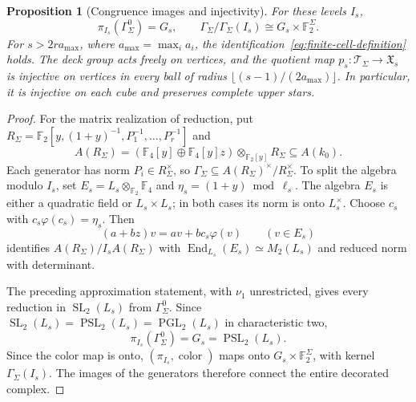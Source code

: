 \documentclass[11pt,letterpaper]{article}
\newtheorem{proposition}[theorem]{Proposition}
\theoremstyle{definition}
\theoremstyle{remark}
\newcommand{\F}{\mathbb F}
\newcommand{\X}{\mathfrak{X}}
\newcommand{\SL}{\operatorname{SL}}
\newcommand{\PGL}{\operatorname{PGL}}
\newcommand{\PSL}{\operatorname{PSL}}
\begin{document}
\begin{proposition}[Congruence images and injectivity]
\label{prop:finite-quotients}
For these levels $I_s$,
\[
 \pi_{I_s}(\Gamma_\Sigma^0)=G_s,\qquad
 \Gamma_\Sigma/\Gamma_\Sigma(I_s)
 \cong G_s\times\F_2^\Sigma.
\]
For $s>2r a_{\max}$, where $a_{\max}=\max_i a_i$,
the identification~\eqref{eq:finite-cell-definition} holds.
The deck group acts freely on vertices, and the quotient map
$p_s:\mathcal T_\Sigma\to\X_s$ is injective on vertices in every
ball of radius $\lfloor(s-1)/(2a_{\max})\rfloor$.
In particular, it is injective on each cube and preserves complete
upper stars.
\end{proposition}
\begin{proof}
For the matrix realization of reduction, put
$R_\Sigma=\F_2[y,(1+y)^{-1},P_1^{-1},\ldots,P_r^{-1}]$ and
\[
 A(R_\Sigma)=(\F_4[y]\oplus\F_4[y]z)\otimes_{\F_2[y]}R_\Sigma
 \subseteq A(k_0).
\]
Each generator has norm $P_i\in R_\Sigma^\times$, so
$\Gamma_\Sigma\subseteq A(R_\Sigma)^\times/R_\Sigma^\times$.
To split the algebra modulo $I_s$, set
$E_s=L_s\otimes_{\F_2}\F_4$ and $\eta_s=(1+y)\bmod\ell_s$.
The algebra $E_s$ is either a quadratic field or $L_s\times L_s$;
in both cases its norm is onto $L_s^\times$. Choose $c_s$ with
$c_s\varphi(c_s)=\eta_s$. Then
\[
 (a+bz)v=av+bc_s\varphi(v)\qquad(v\in E_s)
\]
identifies $A(R_\Sigma)/I_sA(R_\Sigma)$ with
$\operatorname{End}_{L_s}(E_s)\simeq M_2(L_s)$ and reduced norm
with determinant.

The preceding approximation statement, with $\nu_1$ unrestricted,
gives every reduction in $\SL_2(L_s)$ from $\Gamma_\Sigma^0$.
Since $\SL_2(L_s)=\PSL_2(L_s)=\PGL_2(L_s)$ in characteristic two,
\[
 \pi_{I_s}(\Gamma_\Sigma^0)=G_s=\PSL_2(L_s).
\]
Since the color map is onto, $(\pi_{I_s},\operatorname{color})$ maps onto
$G_s\times\F_2^\Sigma$, with kernel $\Gamma_\Sigma(I_s)$.
The images of the
generators therefore connect the entire decorated complex.


\end{proof}
\end{document}
